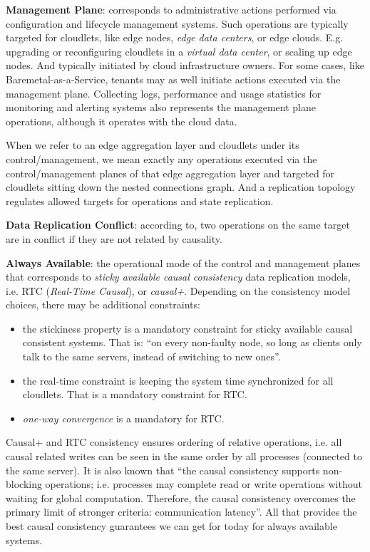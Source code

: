 \documentclass[conference]{IEEEtran}
\begin{document}
\textbf{Management Plane}: corresponds to administrative actions performed via
configuration and lifecycle management systems. Such operations are typically
targeted for cloudlets, like edge nodes, \textit{edge data centers}\cite{b3},
or edge clouds. E.g. upgrading or reconfiguring cloudlets in a \textit{virtual
data center}\cite{b3}, or scaling up edge nodes. And typically initiated by
cloud infrastructure owners. For some cases, like Baremetal-as-a-Service,
tenants may as well initiate actions executed via the management plane.
Collecting logs, performance and usage statistics for monitoring and alerting
systems also represents the management plane operations, although it operates
with the cloud data.

When we refer to an edge aggregation layer and cloudlets under its
control/management, we mean exactly any operations executed via the
control/management planes of that edge aggregation layer and targeted for
cloudlets sitting down the nested connections graph. And a replication topology
regulates allowed targets for operations and state replication.

\textbf{Data Replication Conflict}: according to\cite{b1}, two operations on
the same target are in conflict if they are not related by causality.

\textbf{Always Available}: the operational mode of the control and management
planes that corresponds to \textit{sticky available causal
consistency}\cite{b4} data replication models, i.e. RTC (\textit{Real-Time
Causal}\cite{b2}), or \textit{causal+}\cite{b1}. Depending on the consistency
model choices, there may be additional constraints:

\begin{itemize}
  \item the stickiness property is a mandatory constraint for sticky available
    causal consistent systems. That is: ``on every non-faulty node, so long
    as clients only talk to the same servers, instead of switching to new
    ones''\cite{b4}.

  \item the real-time constraint is keeping the system time synchronized for
    all cloudlets. That is a mandatory constraint for RTC.

  \item \textit{one-way convergence}\cite{b2} is a mandatory for RTC.
\end{itemize}

Causal+ and RTC consistency ensures ordering of relative operations, i.e. all
causal related writes can be seen in the same order by all processes
(connected to the same server). It is also known that ``the causal consistency
supports non-blocking operations; i.e. processes may complete read or write
operations without waiting for global computation. Therefore, the causal
consistency overcomes the primary limit of stronger criteria: communication
latency''\cite{b6}. All that provides the best causal consistency guarantees we
can get for today for always available systems.
\end{document}
